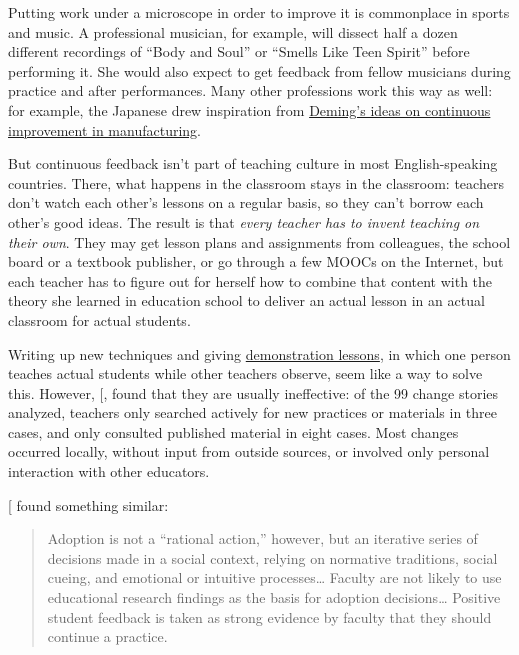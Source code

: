 Putting work under a microscope in order to improve it is commonplace
in sports and music. A professional musician, for example, will
dissect half a dozen different recordings of ``Body and Soul'' or
``Smells Like Teen Spirit'' before performing it. She would also expect
to get feedback from fellow musicians during practice and after
performances. Many other professions work this way as well: for
example, the Japanese drew inspiration from \href{https://en.wikipedia.org/wiki/W._Edwards_Deming}{Deming's ideas on
continuous improvement in manufacturing}.

But continuous feedback isn't part of teaching culture in most
English-speaking countries. There, what happens in the classroom stays
in the classroom: teachers don't watch each other's lessons on a
regular basis, so they can't borrow each other's good ideas. The
result is that \emph{every teacher has to invent teaching on their
own}. They may get lesson plans and assignments from colleagues, the
school board or a textbook publisher, or go through a few MOOCs on the
Internet, but each teacher has to figure out for herself how to
combine that content with the theory she learned in education school
to deliver an actual lesson in an actual classroom for actual
students.

Writing up new techniques and giving \protect\hyperlink{g:demonstration-lesson}{demonstration
lessons}, in which one person teaches actual
students while other teachers observe, seem like a way to solve
this. However, {[},\protect[\hyperlink{b:Finc2012}{Finc2012}]{]} found that they
are usually ineffective: of the 99 change stories analyzed, teachers
only searched actively for new practices or materials in three cases,
and only consulted published material in eight cases. Most changes
occurred locally, without input from outside sources, or involved only
personal interaction with other educators.

{[}\protect[\hyperlink{b:Bark2015}{Bark2015}]{]} found something similar:

\begin{quote}\setlength{\parindent}{0pt}
Adoption is not a ``rational action,'' however, but an iterative series
of decisions made in a social context, relying on normative
traditions, social cueing, and emotional or intuitive
processes\ldots{} Faculty are not likely to use educational
research findings as the basis for adoption decisions\ldots{}
Positive student feedback is taken as strong evidence by faculty that
they should continue a practice.
\end{quote}

